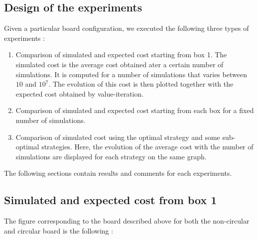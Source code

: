 \subsection{Design of the experiments}
Given a particular board configuration, we executed the following three types of experiments : 
\begin{enumerate}
	\item Comparison of simulated and expected cost starting from box 1.
	The simulated cost is the average cost obtained ater a certain number of simulations.
	It is computed for a number of simulations that varies between $10$ and $10^7$. 
	The evolution of this cost is then plotted together with the expected cost obtained by value-iteration.
	\item Comparison of simulated and expected cost starting from each box for a fixed number of simulations.
	\item Comparison of simulated cost using the optimal strategy and some sub-optimal strategies. 
	Here, the evolution of the average cost  with the number of simulations are displayed for each strategy on the same graph.
\end{enumerate}
The following sections contain results and comments for each experiments.

\subsection{Simulated and expected cost from box 1}

The figure corresponding to the board described above for both the non-circular and circular board is the following :

